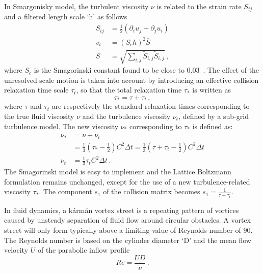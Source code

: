 In Smargonisky model, the turbulent viscosity $\nu$ is related to the strain 
rate $S_{ij}$ and a filtered length scale `h' as follows
%
\begin{align}
S_{ij} & = \frac{1}{2}(\partial_i u_j + \partial_j u_i) \\
\mathit{v}_{\mathit{t}} & = (\mathit{S}_{c}\mathit{h})^{2}\overline{S} \\
\overline{S} & =  
\sqrt{\sum\limits_{\mathit{i,j}}{\tilde{S}_{\mathit{i,j}}\tilde{S}_{\mathit{i,j}}}}\,,
\end{align}
%
\noindent where $\mathit{S}_{c}$ is the Smagorinski constant found to be close 
to 0.03~\citep{yu2005}. 
%
The effect of the unresolved scale motion is taken into account by introducing 
an effective collision relaxation time scale $\tau_{t}$, so that the total 
relaxation time $\tau_{*}$ is written as
%
\begin{equation}
\tau_{*}=\tau + \tau_{t}\,,
\end{equation} 
%
\noindent where $\tau$ and $\tau_{t}$ are respectively the standard relaxation 
times 
corresponding to the true fluid viscosity $\nu$ and the turbulence 
viscosity $\nu_{\mathit{t}}$, defined by a sub-grid turbulence model. 
The new viscosity $\nu_{*}$ corresponding to $\tau_{*}$ is defined as:
%
\begin{align}
\nu_{*} & 
=\nu+\nu_{\mathit{t}} \nonumber \\
	& =\frac{1}{3}(\tau_{*}-\frac{1}{2})
\mathit{C}^{2} \Delta \mathit{t} 
=\frac{1}{3}(\tau+\tau_{t}-\frac{1}{2})\mathit{C}^{2} \Delta \mathit{t}  \\
\nu_{\mathit{t}} & =\frac{1}{3}\tau_{\mathit{t}}\mathit{C}^{2} \Delta 
\textit{t} \,.
\end{align} 
%
The Smagorinski model is easy to implement and the Lattice Boltzmann 
formulation remains unchanged, except for the use of a new turbulence-related 
viscosity $\tau_{*}$. The component $s_1$ of the collision matrix becomes $s_1 
= \frac{1}{\tau+\tau_t}$.

In fluid dynamics, a k\'{a}rm\'{a}n vortex street is a repeating pattern of 
vortices caused by unsteady separation of fluid flow around circular obstacles. 
A vortex street will only form typically above a limiting value of Reynolds 
number of 90. The Reynolds number is based on the cylinder diameter `D' and the 
mean flow velocity $U$ of the parabolic inflow profile
%
\begin{equation}
\label{eq:reynolds}
Re=\frac{UD}{\nu}\,.
\end{equation}

